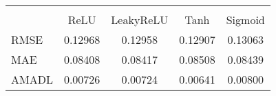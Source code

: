 \begin{tabular}{lcccc}
\hline\hline \\ [-1.8ex]
 & ReLU & LeakyReLU & Tanh & Sigmoid \\ 
 \hline 
RMSE & 0.12968 & 0.12958 & 0.12907 & 0.13063 \\ 
MAE & 0.08408 & 0.08417 & 0.08508 & 0.08439 \\ 
AMADL & 0.00726 & 0.00724 & 0.00641 & 0.00800 \\ 
\hline\hline
\end{tabular}